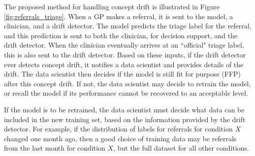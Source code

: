 \begin{displayquote}
  The proposed method for handling concept drift is illustrated in Figure \ref{fig:referrals_triage}. When a GP makes a referral, it is sent to the model, a clinician, and a drift detector. The model predicts the triage label for the referral, and this prediction is sent to both the clinician, for decision support, and the drift detector. When the clinician eventually arrives at an ``official" triage label, this is also sent to the drift detector. Based on these inputs, if the drift detector ever detects concept drift, it notifies a data scientist and provides details of the drift. The data scientist then decides if the model is still fit for purpose (FFP) after this concept drift. If not, the data scientist may decide to retrain the model, or recall the model if its performance cannot be recovered to an acceptable level.

  If the model is to be retrained, the data scientist must decide what data can be included in the new training set, based on the information provided by the drift detector. For example, if the distribution of labels for referrals for condition $X$ changed one month ago, then a good choice of training data may be referrals from the last month for condition $X$, but the full dataset for all other conditions.
\end{displayquote}

